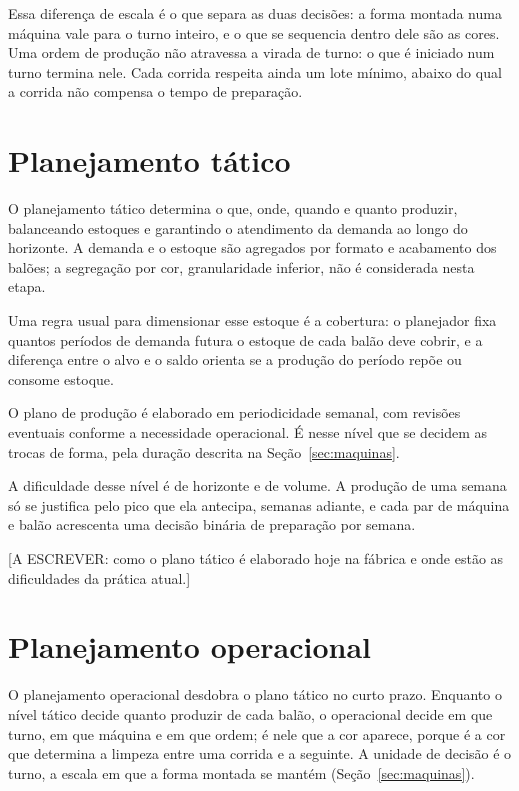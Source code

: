 \documentclass[
    12pt,
    openright,
    oneside,
    a4paper,
    fleqn,
    chapter=TITLE,
    section=TITLE,
    english,
    brazil
]{abntex2}
\begin{document}
Essa diferença de escala é o que separa as duas decisões: a forma montada numa máquina vale para o turno inteiro, e o que se sequencia dentro dele são as cores. Uma ordem de produção não atravessa a virada de turno: o que é iniciado num turno termina nele. Cada corrida respeita ainda um lote mínimo, abaixo do qual a corrida não compensa o tempo de preparação.

\section{Planejamento tático}
\label{sec:planejamento_tatico}

O planejamento tático determina o que, onde, quando e quanto produzir, balanceando estoques e garantindo o atendimento da demanda ao longo do horizonte. A demanda e o estoque são agregados por formato e acabamento dos balões; a segregação por cor, granularidade inferior, não é considerada nesta etapa.

Uma regra usual para dimensionar esse estoque é a cobertura: o planejador fixa quantos períodos de demanda futura o estoque de cada balão deve cobrir, e a diferença entre o alvo e o saldo orienta se a produção do período repõe ou consome estoque.

O plano de produção é elaborado em periodicidade semanal, com revisões eventuais conforme a necessidade operacional. É nesse nível que se decidem as trocas de forma, pela duração descrita na Seção~\ref{sec:maquinas}.

A dificuldade desse nível é de horizonte e de volume. A produção de uma semana só se justifica pelo pico que ela antecipa, semanas adiante, e cada par de máquina e balão acrescenta uma decisão binária de preparação por semana.

[A ESCREVER: como o plano tático é elaborado hoje na fábrica e onde estão as dificuldades da prática atual.]

\section{Planejamento operacional}
\label{sec:planejamento_operacional}

O planejamento operacional desdobra o plano tático no curto prazo. Enquanto o nível tático decide quanto produzir de cada balão, o operacional decide em que turno, em que máquina e em que ordem; é nele que a cor aparece, porque é a cor que determina a limpeza entre uma corrida e a seguinte. A unidade de decisão é o turno, a escala em que a forma montada se mantém (Seção~\ref{sec:maquinas}).
\end{document}
